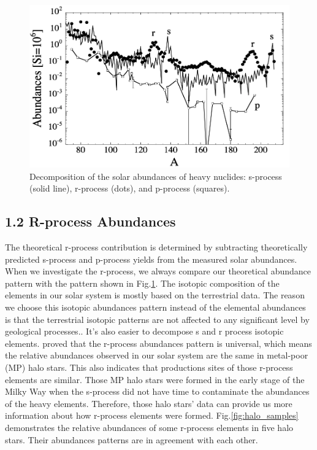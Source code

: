 \documentclass[aps,prl,preprint,groupedaddress]{revtex4}
\begin{document}
\begin{figure}
\centering
\includegraphics[scale=0.3]{decompose_solar}
\caption{
Decomposition of the solar abundances of heavy nuclides: s-process (solid line), r-process (dots), and p-process (squares).
}
\label{fig:decompose_solar}
\end{figure}

\subsection{1.2 R-process Abundances}
The theoretical r-process contribution is determined by subtracting theoretically predicted s-process and p-process yields from the measured solar abundances. When we investigate the r-process, we always compare our theoretical abundance pattern with the pattern shown in Fig.\ref{fig:decompose_solar}. The isotopic composition of the elements in our solar system is mostly based on the terrestrial data. The reason we choose this isotopic abundances pattern instead of the elemental abundances is that the terrestrial isotopic patterns are not affected to any significant level by geological processes.\cite{2007PhR...450...97A}. It's also easier to decompose s and r process isotopic elements. \cite{0004-637X-544-1-302} proved that the r-process abundances pattern is universal, which means the relative abundances observed in our solar system are the same in metal-poor (MP) halo stars. This also indicates that productions sites of those r-process elements are similar. Those MP halo stars were formed in the early stage of the Milky Way when the s-process did not have time to contaminate the abundances of the heavy elements. Therefore, those halo stars' data can provide us more information about how r-process elements were formed. Fig.\ref{fig:halo_samples} demonstrates the relative abundances of some r-process elements in five halo stars. Their abundances patterns are in agreement with each other.\\
\end{document}
